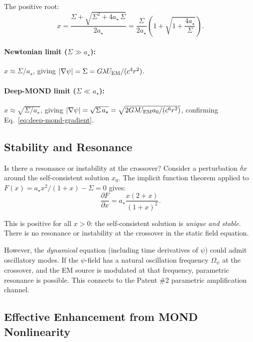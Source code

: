 \documentclass[aps,prd,twocolumn,superscriptaddress,nofootinbib]{revtex4-2}
\newcommand{\astar}{a_\star}
\newcommand{\lam}{\lambda}
\begin{document}
The positive root:
\begin{equation}\label{eq:x-exact}
x = \frac{\Sigma + \sqrt{\Sigma^2 + 4\astar\,\Sigma}}{2\astar}
= \frac{\Sigma}{2\astar}\left(1 + \sqrt{1 + \frac{4\astar}{\Sigma}}\right).
\end{equation}

\paragraph{Newtonian limit ($\Sigma \gg \astar$):}
$x \approx \Sigma/\astar$, giving $|\nabla\psi| = \Sigma = G\lam U_{\rm EM}/(c^4 r^2)$.

\paragraph{Deep-MOND limit ($\Sigma \ll \astar$):}
$x \approx \sqrt{\Sigma/\astar}$, giving
$|\nabla\psi| = \sqrt{\Sigma\,\astar} = \sqrt{2G\lam U_{\rm EM}a_0/(c^6 r^2)}$,
confirming Eq.~\eqref{eq:deep-mond-gradient}.

\subsection{Stability and Resonance}

Is there a resonance or instability at the crossover?  Consider a
perturbation $\delta x$ around the self-consistent solution $x_0$.
The implicit function theorem applied to $F(x) = \astar x^2/(1+x) - \Sigma = 0$
gives:
\begin{equation}
\frac{\partial F}{\partial x} = \astar\frac{x(2+x)}{(1+x)^2}.
\end{equation}

This is positive for all $x > 0$: the self-consistent solution is
\emph{unique and stable}.  There is no resonance or instability at
the crossover in the static field equation.

However, the \emph{dynamical} equation (including time derivatives
of $\psi$) could admit oscillatory modes.  If the $\psi$-field has
a natural oscillation frequency $\Omega_\psi$ at the crossover,
and the EM source is modulated at that frequency, parametric
resonance is possible.  This connects to the Patent \#2
parametric amplification channel.

\subsection{Effective Enhancement from MOND Nonlinearity}
\end{document}

